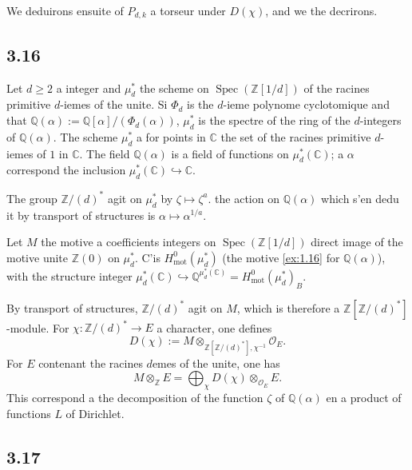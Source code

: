 \documentclass[12pt,a4paper]{article}
\theoremstyle{plain}
\theoremstyle{definition}
\theoremstyle{remark}
\DeclareMathOperator{\Spec}{Spec}
\newcommand{\mot}{\mathrm{mot}}
\providecommand{\Spec}{\operatorname{Spec}}
\providecommand{\mot}{\mathrm{mot}}
\begin{document}
We deduirons ensuite of $P_{d,k}$ a torseur under $D(\chi)$, and we the decrirons.

\subsection*{3.16}

Let \(d \geq 2\) a integer and \(\mu_d^*\) the scheme on
\(\Spec(\mathbb{Z}[1/d])\) of the racines primitive \(d\)-iemes of the unite. Si
\(\Phi_d\) is the \(d\)-ieme polynome cyclotomique and that
\(\mathbb{Q}(\alpha):=\mathbb{Q}[\alpha]/(\Phi_d(\alpha))\), \(\mu_d^*\) is the spectre of the ring of the
\(d\)-integers of \(\mathbb{Q}(\alpha)\). The scheme \(\mu_d^*\) a for points in
\(\mathbb{C}\) the set of the racines primitive \(d\)-iemes of \(1\) in \(\mathbb{C}\). The
field \(\mathbb{Q}(\alpha)\) is a field of functions on \(\mu_d^*(\mathbb{C})\); a
\(\alpha\) correspond the inclusion \(\mu_d^*(\mathbb{C}) \hookrightarrow \mathbb{C}\).

The group $\mathbb{Z}/(d)^*$ agit on $\mu_d^*$ by $\zeta \mapsto \zeta^a$. the action on
$\mathbb{Q}(\alpha)$ which s'en dedu it by transport of structures is
$\alpha \mapsto \alpha^{1/a}$.

Let $M$ the motive a coefficients integers on $\Spec(\mathbb{Z}[1/d])$ direct image of the
motive unite $\mathbb{Z}(0)$ on $\mu_d^*$. C'is $H^0_\mot(\mu_d^*)$ (the motive
\ref{ex:1.16} for $\mathbb{Q}(\alpha)$), with the structure integer
$\mu_d^*(\mathbb{C}) \hookrightarrow \mathbb{Q}^{\mu_d^*(\mathbb{C})} =
H^0_\mot(\mu_d^*)_B$.

By transport of structures, $\mathbb{Z}/(d)^*$ agit on $M$, which is therefore a
$\mathbb{Z}[\mathbb{Z}/(d)^*]$-module. For $\chi: \mathbb{Z}/(d)^* \to E$ a
character, one defines
\[
D(\chi) := M \otimes_{\mathbb{Z}[\mathbb{Z}/(d)^*], \chi^{-1}} \mathcal{O}_E.
\]
For $E$ contenant the racines $d$emes of the unite, one has
\[
M \otimes_{\mathbb{Z}} E = \bigoplus_\chi D(\chi) \otimes_{\mathcal{O}_E} E.
\]
This correspond a the decomposition of the function $\zeta$ of $\mathbb{Q}(\alpha)$ en a
product of functions $L$ of Dirichlet.

\subsection*{3.17}
\end{document}
